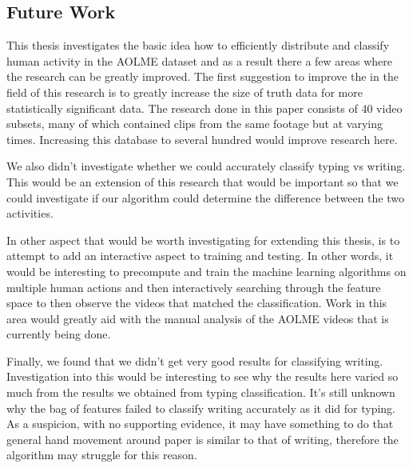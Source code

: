 
\subsection{Future Work}
\PARstart This thesis investigates the basic idea how to efficiently distribute and classify
human activity in the AOLME dataset and as a result there a few areas where the
research can be greatly improved. The first suggestion to improve the in the field
of this research is to greatly increase the size of truth data for more
statistically significant data. The research done in this paper consists of 40 video
subsets, many of which contained clips from the same footage but at varying times.
Increasing this database to several hundred would improve research here.

We also didn't investigate whether we could accurately classify typing vs writing.
This would be an extension of this research that would be important so that we
could investigate if our algorithm could determine the difference between the two
activities.

In other aspect that would be worth investigating for extending this thesis,
is to attempt to add an interactive aspect to training and testing. In other words,
it would be interesting to precompute and train the machine learning algorithms
on multiple human actions and then interactively searching through the feature
space to then observe the videos that matched the classification. Work in this
area would greatly aid with the manual analysis of the AOLME videos that is
currently being done.

Finally, we found that we didn't get very good results for classifying writing.
Investigation into this would be interesting to see why the results here varied
so much from the results we obtained from typing classification. It's still unknown
why the bag of features failed to classify writing accurately as it did for typing.
As a suspicion, with no supporting evidence, it may have something to do that
general hand movement around paper is similar to that of writing, therefore the
algorithm may struggle for this reason.

